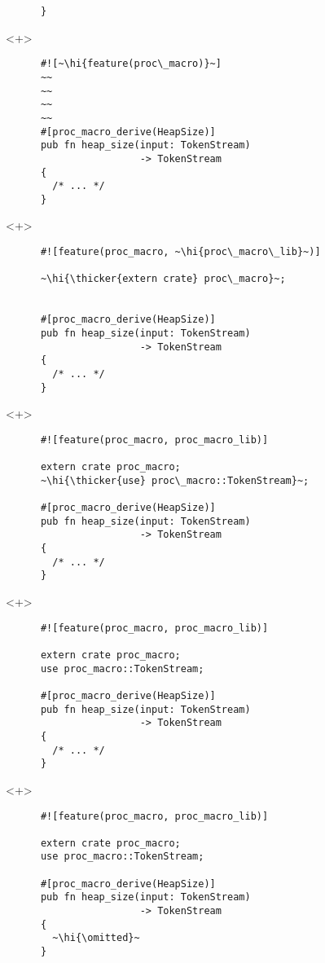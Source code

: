 \documentclass[usepdftitle=false]{beamer}
\renewcommand{\&}{\makebox[\widthof{\ampersand}][c]{\scalebox{0.9}[1.0]{\Book\ampersand}}}
\newcommand{\+}{\makebox[\widthof{+}][c]{\raisebox{-.2\height}{\scalefont{1.5}\Light+}}}
\newcommand{\thicker}[1]{\contourlength{0.26pt}\contour[10]{black}{#1}}
\newcommand{\hi}[1]{%
\tikz[baseline=(A.base)]
 \node[highlighting=0,inner sep=0pt,text depth=0pt] (A) {#1};%
}
\newcommand{\omitted}{/* ... */}
\begin{document}
\begin{frame}[fragile]
\begin{onlyenv}
\begin{verbatim}
      }
    \end{verbatim}
  \end{onlyenv}
  \begin{onlyenv}<+>
    \begin{verbatim}
      #![~\hi{feature(proc\_macro)}~]
      ~~
      ~~
      ~~
      ~~
      #[proc_macro_derive(HeapSize)]
      pub fn heap_size(input: TokenStream)
                       -> TokenStream
      {
        /* ... */
      }
    \end{verbatim}
  \end{onlyenv}
  \begin{onlyenv}<+>
    \begin{verbatim}
      #![feature(proc_macro, ~\hi{proc\_macro\_lib}~)]

      ~\hi{\thicker{extern crate} proc\_macro}~;


      #[proc_macro_derive(HeapSize)]
      pub fn heap_size(input: TokenStream)
                       -> TokenStream
      {
        /* ... */
      }
    \end{verbatim}
  \end{onlyenv}
  \begin{onlyenv}<+>
    \begin{verbatim}
      #![feature(proc_macro, proc_macro_lib)]

      extern crate proc_macro;
      ~\hi{\thicker{use} proc\_macro::TokenStream}~;

      #[proc_macro_derive(HeapSize)]
      pub fn heap_size(input: TokenStream)
                       -> TokenStream
      {
        /* ... */
      }
    \end{verbatim}
  \end{onlyenv}
  \begin{onlyenv}<+>
    \begin{verbatim}
      #![feature(proc_macro, proc_macro_lib)]

      extern crate proc_macro;
      use proc_macro::TokenStream;

      #[proc_macro_derive(HeapSize)]
      pub fn heap_size(input: TokenStream)
                       -> TokenStream
      {
        /* ... */
      }
    \end{verbatim}
  \end{onlyenv}
  \begin{onlyenv}<+>
    \begin{verbatim}
      #![feature(proc_macro, proc_macro_lib)]

      extern crate proc_macro;
      use proc_macro::TokenStream;

      #[proc_macro_derive(HeapSize)]
      pub fn heap_size(input: TokenStream)
                       -> TokenStream
      {
        ~\hi{\omitted}~
      }
    \end{verbatim}
  \end{onlyenv}
\end{frame}
\end{document}
